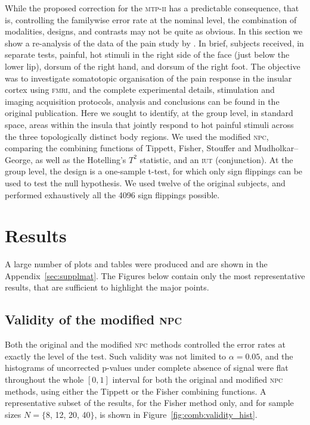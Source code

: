 While the proposed correction for the \textsc{mtp-ii} has a predictable consequence, that is, controlling the familywise error rate at the nominal level, the combination of modalities, designs, and contrasts may not be quite as obvious. In this section we show a re-analysis of the data of the pain study by \citet{Brooks2005}. In brief, subjects received, in separate tests, painful, hot stimuli in the right side of the face (just below the lower lip), dorsum of the right hand, and dorsum of the right foot. The objective was to investigate somatotopic organisation of the pain response in the insular cortex using \textsc{fmri}, and the complete experimental details, stimulation and imaging acquisition protocols, analysis and conclusions can be found in the original publication. Here we sought to identify, at the group level, in standard space, areas within the insula that jointly respond to hot painful stimuli across the three topologically distinct body regions. We used the modified \textsc{npc}, comparing the combining functions of Tippett, Fisher, Stouffer and Mudholkar--George, as well as the Hotelling's $T^2$ statistic, and an \textsc{iut} (conjunction). At the group level, the design is a one-sample t-test, for which only sign flippings can be used to test the null hypothesis. We used twelve of the original subjects, and performed exhaustively all the 4096 sign flippings possible.

\section{Results}

A large number of plots and tables were produced and are shown in the Appendix~\ref{sec:supplmat}. The Figures below contain only the most representative results, that are sufficient to highlight the major points.

\subsection{Validity of the modified \textsc{npc}}

Both the original and the modified \textsc{npc} methods controlled the error rates at exactly the level of the test. Such validity was not limited to $\alpha=0.05$, and the histograms of uncorrected p-values under complete absence of signal were flat throughout the whole $[0, 1]$ interval for both the original and modified \textsc{npc} methods, using either the Tippett or the Fisher combining functions. A representative subset of the results, for the Fisher method only, and for sample sizes $N = \{$8, 12, 20, 40$\}$, is shown in Figure~\ref{fig:comb:validity_hist}.


